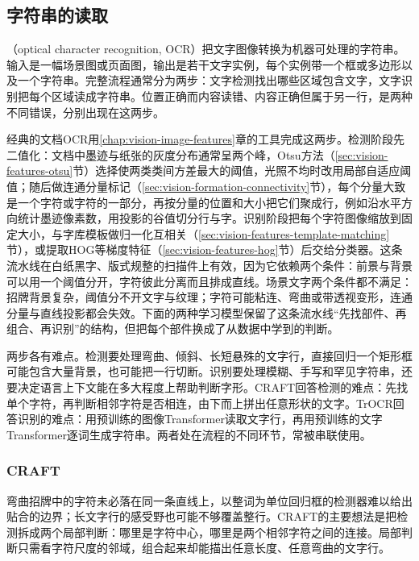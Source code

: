 \subsection{字符串的读取}
\label{sec:vision-understanding-ocr}

（optical character recognition, OCR）把文字图像转换为机器可处理的字符串。输入是一幅场景图或页面图，输出是若干文字实例，每个实例带一个框或多边形以及一个字符串。完整流程通常分为两步：文字检测找出哪些区域包含文字，文字识别把每个区域读成字符串。位置正确而内容读错、内容正确但属于另一行，是两种不同错误，分别出现在这两步。

经典的文档OCR用\ref{chap:vision-image-features}章的工具完成这两步。检测阶段先二值化：文档中墨迹与纸张的灰度分布通常呈两个峰，Otsu方法（\ref{sec:vision-features-otsu}节）选择使两类类间方差最大的阈值，光照不均时改用局部自适应阈值；随后做连通分量标记（\ref{sec:vision-formation-connectivity}节），每个分量大致是一个字符或字符的一部分，再按分量的位置和大小把它们聚成行，例如沿水平方向统计墨迹像素数，用投影的谷值切分行与字。识别阶段把每个字符图像缩放到固定大小，与字库模板做归一化互相关（\ref{sec:vision-features-template-matching}节），或提取HOG等梯度特征（\ref{sec:vision-features-hog}节）后交给分类器。这条流水线在白纸黑字、版式规整的扫描件上有效，因为它依赖两个条件：前景与背景可以用一个阈值分开，字符彼此分离而且排成直线。场景文字两个条件都不满足：招牌背景复杂，阈值分不开文字与纹理；字符可能粘连、弯曲或带透视变形，连通分量与直线投影都会失效。下面的两种学习模型保留了这条流水线“先找部件、再组合、再识别”的结构，但把每个部件换成了从数据中学到的判断。

两步各有难点。检测要处理弯曲、倾斜、长短悬殊的文字行，直接回归一个矩形框可能包含大量背景，也可能把一行切断。识别要处理模糊、手写和罕见字符串，还要决定语言上下文能在多大程度上帮助判断字形。CRAFT回答检测的难点：先找单个字符，再判断相邻字符是否相连，由下而上拼出任意形状的文字。TrOCR回答识别的难点：用预训练的图像Transformer读取文字行，再用预训练的文字Transformer逐词生成字符串。两者处在流程的不同环节，常被串联使用。

\subsubsection{CRAFT}
\label{sec:vision-understanding-craft}

弯曲招牌中的字符未必落在同一条直线上，以整词为单位回归框的检测器难以给出贴合的边界；长文字行的感受野也可能不够覆盖整行。CRAFT的主要想法是把检测拆成两个局部判断：哪里是字符中心，哪里是两个相邻字符之间的连接。局部判断只需看字符尺度的邻域，组合起来却能描出任意长度、任意弯曲的文字行。

